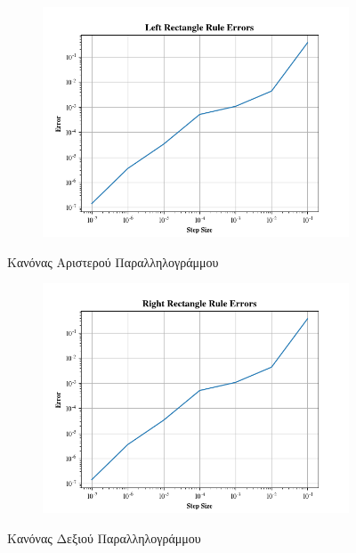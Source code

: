 \documentclass{article}
\begin{document}
\vspace*{\fill}
\noindent
\hspace*{-\oddsidemargin}%
\begin{figure}[H]
    \centering
	
	\begin{adjustbox}{center}
		\begin{subfigure}[c]{.8\textwidth}    
			\includegraphics[width=1\textwidth,height=\textheight,keepaspectratio]{media/1/Figure_1.png}
		\end{subfigure}%
	\end{adjustbox}
	\caption{Κανόνας Αριστερού Παραλληλογράμμου}
	
    \label{(Left_Rectangular_Rule)}
\end{figure}
\vspace*{\fill}

\newpage
\begin{figure}[H]
	\begin{adjustbox}{center}
		\begin{subfigure}[c]{.8\textwidth}    
			\includegraphics[width=1\textwidth,height=\textheight,keepaspectratio]{media/1/Figure_3.png}
		\end{subfigure}%
	\end{adjustbox}
    \caption{Κανόνας Δεξιού Παραλληλογράμμου}
    \label{(Right_Rectangular_Rule)}
\end{figure}
\end{document}

